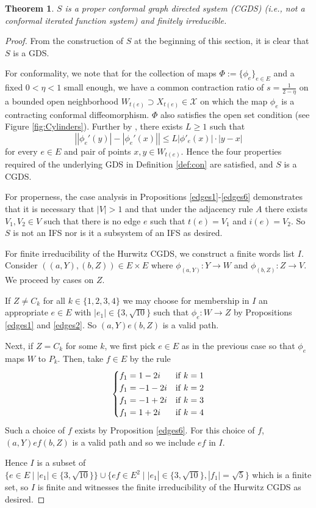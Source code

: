 \documentclass[11pt]{amsart}
\theoremstyle{plain}
\newtheorem{theorem}{Theorem}[section]
\theoremstyle{definition}
\renewcommand\~{\tilde}%
\newcommand{\cX}{\ensuremath{\mathcal{X}}}
\numberwithin{equation}{section}
\begin{document}
\begin{theorem}\label{thm:FI}
    $S$ is a proper conformal graph directed system (CGDS) (i.e., not a conformal iterated function system) and finitely irreducible.
\end{theorem}

\begin{proof}
    From the construction of $S$ at the beginning of this section, it is clear that $S$ is a GDS. 
    
    For conformality, we note that for the collection of maps $\Phi:=\{\phi_e\}_{e\in E}$ and a fixed $0<\eta<1$ small enough, we have a common contraction ratio of $s= \frac{1}{2-\eta}$ on a bounded open neighborhood $W_{t(e)}\supset X_{t(e)}\in \cX$ on which the map $\phi_e$ is a contracting conformal diffeomorphism. $\Phi$ also satisfies the open set condition (see Figure \ref{fig:Cylinders}). Further by \cite[Remark 19.3.2(c)]{Urbanski22}, there exists $L\geq 1$ such that 
    $$
        \left\vert|\phi_e'(y)|-|\phi_e'(x)|\right|\leq L|\phi'_e(x)|\cdot |y-x|
    $$
    for every $e\in E$ and pair of points $x,y\in W_{t(e)}$. Hence the four properties  required of the underlying GDS in Definition \ref{def:con} are satisfied, and $S$ is a CGDS.
    
    For properness, the case analysis in Propositions \ref{edges1}-\ref{edges6} demonstrates that it is necessary that $|V|>1$ and that under the adjacency rule $A$ there exists $V_1,V_2\in V$ such that there is no edge $e$ such that $t(e) = V_1$ and $i(e)=V_2$. So $S$ is not an IFS nor is it a subsystem of an IFS as desired. 
    
    For finite irreducibility of the Hurwitz CGDS, we construct a finite words list $I$. Consider $((a,Y),(b,Z))\in E\times E$ where $\phi_{(a,Y)}:Y\to W$ and $\phi_{(b,Z)}: Z\to V$. We proceed by cases on $Z$. 
    
    If $Z\neq C_k$ for all $k\in \{1,2,3,4\}$ we may choose for membership in $I$ an appropriate $e\in E$ with $|e_1| \in\{3, \sqrt{10}\}$ such that $\phi_e: W\to Z$ by Propositions \ref{edges1} and \ref{edges2}. So $(a,Y)e(b,Z)$ is a valid path. 
    
    Next, if $Z= C_k$ for some $k$, we first pick $e\in E$ as in the previous case so that $\phi_e$ maps $W$ to $P_k$. Then, take $f\in E$ by the rule
    $$
    \begin{cases}
        f_1 = 1-2i &{\rm if \;} k=1\\
        f_1 = -1-2i &{\rm if \;} k=2\\
        f_1 = -1+2i &{\rm if \;} k=3\\
        f_1 = 1+2i &{\rm if \;} k=4
    \end{cases}
    $$
    Such a choice of $f$ exists by Proposition \ref{edges6}. For this choice of $f$, $(a,Y)ef(b,Z)$ is a valid path and so we include $ef$ in $I$.
    
    Hence $I$ is a subset of $\{e\in E\;\vert\; |e_1| \in\{3, \sqrt{10}\}\}\cup \{ef\in E^2\;|\; |e_1|\in\{3, \sqrt{10}\},|f_1| =\sqrt{5}\}$ which is a finite set, so $I$ is finite and witnesses the finite irreducibility of the Hurwitz CGDS as desired.  
\end{proof}
\end{document}
